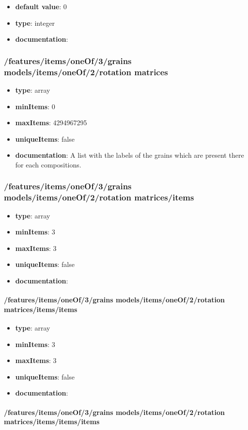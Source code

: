 \begin{itemize}\item {\bf default value}: 0
\item {\bf type}: integer
\item {\bf documentation}: 
\end{itemize}\subsubsection{/features/items/oneOf/3/grains models/items/oneOf/2/rotation matrices}
\begin{itemize}\item {\bf type}: array
\item {\bf minItems}: 0
\item {\bf maxItems}: 4294967295
\item {\bf uniqueItems}: false
\item {\bf documentation}: A list with the labels of the grains which are present there for each compositions.
\end{itemize}\subsubsection{/features/items/oneOf/3/grains models/items/oneOf/2/rotation matrices/items}
\begin{itemize}\item {\bf type}: array
\item {\bf minItems}: 3
\item {\bf maxItems}: 3
\item {\bf uniqueItems}: false
\item {\bf documentation}: 
\end{itemize}\paragraph{/features/items/oneOf/3/grains models/items/oneOf/2/rotation matrices/items/items}
\begin{itemize}\item {\bf type}: array
\item {\bf minItems}: 3
\item {\bf maxItems}: 3
\item {\bf uniqueItems}: false
\item {\bf documentation}: 
\end{itemize}\paragraph{/features/items/oneOf/3/grains models/items/oneOf/2/rotation matrices/items/items/items}
